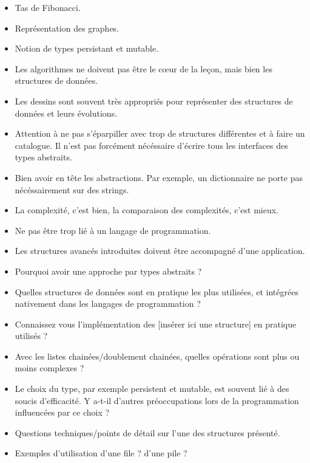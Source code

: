 \documentclass{agregfiche}
\begin{document}
\secidees

\begin{itemize}
	\item Tas de Fibonacci.
	\item Représentation des graphes.
    	\item Notion de types persistant et mutable.
\end{itemize}

\secpieges

\begin{itemize}
	\item Les algorithmes ne doivent pas être le c\oe ur de la leçon, mais bien les structures de données.
	\item Les dessins sont souvent très appropriés pour représenter des structures de données et leurs évolutions.
   	\item Attention à ne pas s'éparpiller avec trop de structures différentes et à faire un catalogue. Il n'est pas forcément nécéssaire d'écrire tous les interfaces des types abstraits.
	\item Bien avoir en tête les abstractions. Par exemple, un dictionnaire ne porte pas nécéssairement sur des strings.
	\item La complexité, c'est bien, la comparaison des complexités, c'est mieux.
	\item Ne pas être trop lié à un langage de programmation.
	\item Les structures avancés introduites doivent être accompagné d'une application.
\end{itemize}

\secquestionsclassiques

\begin{itemize}
	\item Pourquoi avoir une approche par types abstraits ?
	\item Quelles structures de données sont en pratique les plus
	utilisées, et intégrées nativement dans les langages de
	programmation ?
	\item Connaissez vous l'implémentation des [insérer ici une
	structure] en pratique utilisés ?
	\item Avec les listes chainées/doublement chainées, quelles
	opérations sont plus ou moins complexes ?
	\item Le choix du type, par exemple persistent et mutable, est souvent lié à des soucis d'efficacité. Y a-t-il d'autres préoccupations lors de la programmation influencées par ce choix ?
    \item Questions techniques/points de détail sur l'une des 
    structures présenté.
    \item Exemples d'utilisation d'une file ? d'une pile ?

\end{itemize}
\end{document}
